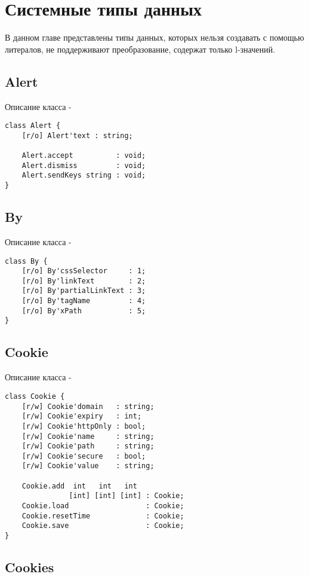 \section{Системные типы данных}

В данном главе представлены типы данных, которых нельзя создавать с помощью литералов, не поддерживают преобразование, содержат только l-значений.

\subsection{{\color{orange} Alert}}

\noindent Описание класса  -
\begin{lstlisting}[numbers=none]
class Alert {
    [r/o] Alert'text : string;
	
    Alert.accept          : void;
	Alert.dismiss         : void;
	Alert.sendKeys string : void;
}
\end{lstlisting}

\subsection{{\color{orange} By}}

\noindent Описание класса  -
\begin{lstlisting}[numbers=none]
class By {
    [r/o] By'cssSelector     : 1;
	[r/o] By'linkText        : 2;
	[r/o] By'partialLinkText : 3;
	[r/o] By'tagName         : 4;
	[r/o] By'xPath           : 5;
}
\end{lstlisting}

\subsection{{\color{orange} Cookie}}

\noindent Описание класса  -
\begin{lstlisting}[numbers=none]
class Cookie {
    [r/w] Cookie'domain   : string;
	[r/w] Cookie'expiry   : int;
	[r/w] Cookie'httpOnly : bool;
	[r/w] Cookie'name     : string;
	[r/w] Cookie'path     : string;
	[r/w] Cookie'secure   : bool;
	[r/w] Cookie'value    : string;
	
    Cookie.add  int   int   int
	           [int] [int] [int] : Cookie;
	Cookie.load                  : Cookie;
	Cookie.resetTime             : Cookie;
	Cookie.save                  : Cookie;
}
\end{lstlisting}

\subsection{{\color{orange} Cookies}}

